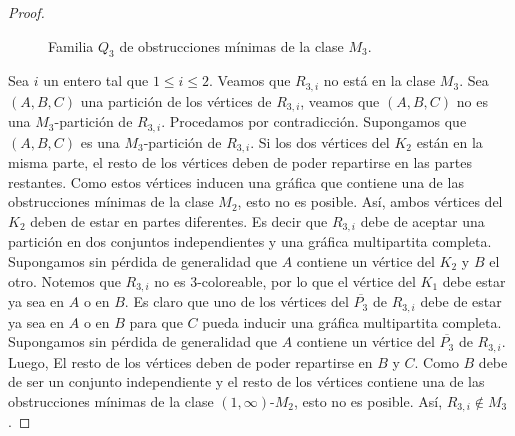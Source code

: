 \begin{proof}
\begin{figure}[ht!]
\begin{subfigure}{\textwidth}
\begin{center}
\end{center}
\end{subfigure}

\caption{Familia $Q_3$ de obstrucciones mínimas de la clase $M_3$.}
\label{obsts_M3_Q}
\end{figure} 

Sea $i$ un entero tal que $1\le i \le 2$. Veamos que $R_{3,i}$ no está en la clase $M_3$. Sea $(A,B,C)$ una partición de los vértices de $R_{3,i}$, veamos que $(A,B,C)$ no es una $M_3$-partición de $R_{3,i}$. Procedamos por contradicción. Supongamos que $(A,B,C)$ es una $M_3$-partición de $R_{3,i}$. Si los dos vértices del $K_2$ están en la misma parte, el resto de los vértices deben de poder repartirse en las partes restantes. Como estos vértices inducen una gráfica que contiene una de las obstrucciones mínimas de la clase $M_2$, esto no es posible. Así, ambos vértices del $K_2$ deben de estar en partes diferentes. Es decir que $R_{3,i}$ debe de aceptar una partición en dos conjuntos independientes y una gráfica multipartita completa. Supongamos sin pérdida de generalidad que $A$ contiene un vértice del $K_2$ y $B$ el otro. Notemos que $R_{3,i}$ no es 3-coloreable, por lo que el vértice del $K_1$ debe estar ya sea en $A$ o en $B$. Es claro que uno de los vértices del $\overline{P_3}$ de $R_{3,i}$ debe de estar ya sea en $A$ o en $B$ para que $C$ pueda inducir una gráfica multipartita completa. Supongamos sin pérdida de generalidad que $A$ contiene un vértice del  $\overline{P_3}$ de $R_{3,i}$. Luego, El resto de los vértices deben de poder repartirse en $B$ y $C$. Como $B$ debe de ser un conjunto independiente y el resto de los vértices contiene una de las obstrucciones mínimas de la clase $(1,\infty)$-$M_2$, esto no es posible. Así, $R_{3,i}\notin M_3$. 
   

\end{proof}
